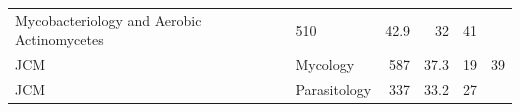 \documentclass[11pt,]{article}
\begin{document}
\begin{longtable}[]{@{}llrrrr@{}}
\begin{minipage}[t]{0.43\columnwidth}
Mycobacteriology and Aerobic Actinomycetes\strut
\end{minipage} & \begin{minipage}[t]{0.04\columnwidth}\raggedleft\strut
510\strut
\end{minipage} & \begin{minipage}[t]{0.08\columnwidth}\raggedleft\strut
42.9\strut
\end{minipage} & \begin{minipage}[t]{0.11\columnwidth}\raggedleft\strut
32\strut
\end{minipage} & \begin{minipage}[t]{0.11\columnwidth}\raggedleft\strut
41\strut
\end{minipage}\tabularnewline
\begin{minipage}[t]{0.06\columnwidth}\raggedright\strut
JCM\strut
\end{minipage} & \begin{minipage}[t]{0.43\columnwidth}\raggedright\strut
Mycology\strut
\end{minipage} & \begin{minipage}[t]{0.04\columnwidth}\raggedleft\strut
587\strut
\end{minipage} & \begin{minipage}[t]{0.08\columnwidth}\raggedleft\strut
37.3\strut
\end{minipage} & \begin{minipage}[t]{0.11\columnwidth}\raggedleft\strut
19\strut
\end{minipage} & \begin{minipage}[t]{0.11\columnwidth}\raggedleft\strut
39\strut
\end{minipage}\tabularnewline
\begin{minipage}[t]{0.06\columnwidth}\raggedright\strut
JCM\strut
\end{minipage} & \begin{minipage}[t]{0.43\columnwidth}\raggedright\strut
Parasitology\strut
\end{minipage} & \begin{minipage}[t]{0.04\columnwidth}\raggedleft\strut
337\strut
\end{minipage} & \begin{minipage}[t]{0.08\columnwidth}\raggedleft\strut
33.2\strut
\end{minipage} & \begin{minipage}[t]{0.11\columnwidth}\raggedleft\strut
27\strut
\end{minipage} & \begin{minipage}[t]{0.11\columnwidth}\raggedleft\strut

\end{minipage}
\end{longtable}
\end{document}
